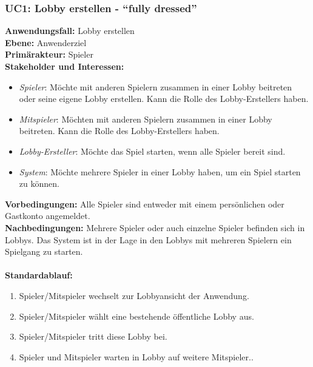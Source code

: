 \documentclass[11pt,ngerman]{article}
\newcommand{\quotes}[1]{``#1''}
\begin{document}
    \subsubsection{UC1: Lobby erstellen - \quotes{fully dressed}}
    \label{ssec:UC1Lobbyerstellen}
    \begin{tcolorbox}[enhanced, breakable, sharp corners, width=\dimexpr\textwidth-15mm\relax ,enlarge left by=10mm ,fontupper=\linespread{1.1}\selectfont, boxrule=1pt, title={UC1: Lobby erstellen}, colback=white, colframe=gray!22, coltitle=black]

    	\textbf{Anwendungsfall:} Lobby erstellen \\
    	\textbf{Ebene:} Anwenderziel \\
    	\textbf{Primärakteur:} Spieler \\
    	\textbf{Stakeholder und Interessen:}
    	\begin{itemize}
    		\item \textit{Spieler}: Möchte mit anderen Spielern zusammen in einer \Gls{Lobby} beitreten oder seine eigene \Gls{Lobby} erstellen. Kann die Rolle des Lobby-Erstellers haben.
    		\item \textit{Mitspieler}: Möchten mit anderen Spielern zusammen in einer \Gls{Lobby} beitreten. Kann die Rolle des Lobby-Erstellers haben.
    		\item \textit{Lobby-Ersteller}:  Möchte das Spiel starten, wenn alle Spieler bereit sind.
    		\item \textit{System}: Möchte mehrere Spieler in einer \Gls{Lobby} haben, um ein Spiel starten zu können.
    	\end{itemize}
    	\textbf{Vorbedingungen:} Alle Spieler sind entweder mit einem persönlichen oder Gastkonto angemeldet.\\
    	\textbf{Nachbedingungen:} Mehrere Spieler oder auch einzelne Spieler befinden sich in \Glspl{Lobby}. Das System ist in der Lage in den \Glspl{Lobby} mit mehreren Spielern ein Spielgang zu starten. \\
    	\\  \textbf{Standardablauf:}
    	\begin{enumerate}
    		\item Spieler/Mitspieler wechselt zur Lobbyansicht der Anwendung.
    		\item Spieler/Mitspieler wählt eine bestehende öffentliche \Gls{Lobby} aus.
    		\item Spieler/Mitspieler tritt diese \Gls{Lobby} bei.
    		\item Spieler und Mitspieler warten in \Gls{Lobby} auf weitere Mitspieler..

\end{enumerate}
\end{tcolorbox}
\end{document}
